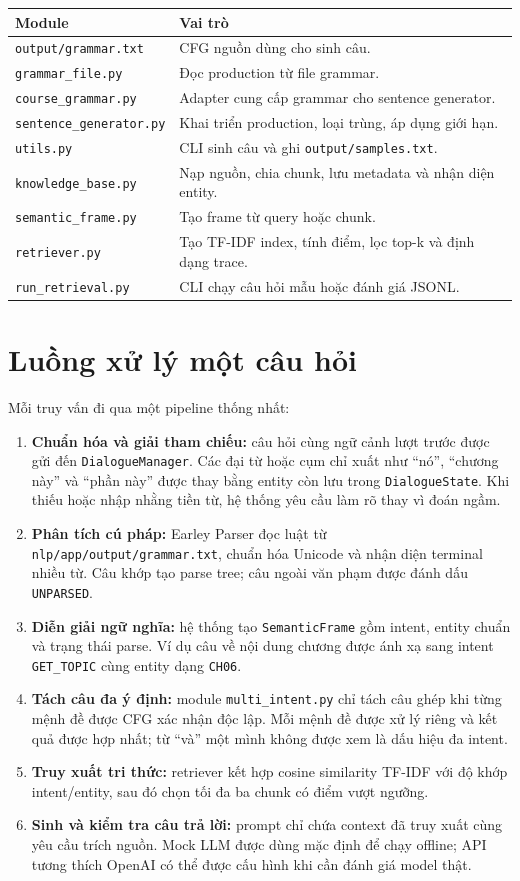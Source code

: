\begin{longtable}{p{}p{}}
\toprule
Module & Vai trò \\
\midrule
\texttt{output/grammar.txt} & CFG nguồn dùng cho sinh câu. \\
\texttt{grammar\_file.py} & Đọc production từ file grammar. \\
\texttt{course\_grammar.py} & Adapter cung cấp grammar cho sentence generator. \\
\texttt{sentence\_generator.py} & Khai triển production, loại trùng, áp dụng giới hạn. \\
\texttt{utils.py} & CLI sinh câu và ghi \texttt{output/samples.txt}. \\
\texttt{knowledge\_base.py} & Nạp nguồn, chia chunk, lưu metadata và nhận diện entity. \\
\texttt{semantic\_frame.py} & Tạo frame từ query hoặc chunk. \\
\texttt{retriever.py} & Tạo TF-IDF index, tính điểm, lọc top-k và định dạng trace. \\
\texttt{run\_retrieval.py} & CLI chạy câu hỏi mẫu hoặc đánh giá JSONL. \\
\bottomrule
\end{longtable}

\section{Luồng xử lý một câu hỏi}

Mỗi truy vấn đi qua một pipeline thống nhất:
\begin{enumerate}
  \item \textbf{Chuẩn hóa và giải tham chiếu:} câu hỏi cùng ngữ cảnh lượt trước được gửi đến \texttt{DialogueManager}. Các đại từ hoặc cụm chỉ xuất như “nó”, “chương này” và “phần này” được thay bằng entity còn lưu trong \texttt{DialogueState}. Khi thiếu hoặc nhập nhằng tiền từ, hệ thống yêu cầu làm rõ thay vì đoán ngầm.
  \item \textbf{Phân tích cú pháp:} Earley Parser đọc luật từ \texttt{nlp/app/output/grammar.txt}, chuẩn hóa Unicode và nhận diện terminal nhiều từ. Câu khớp tạo parse tree; câu ngoài văn phạm được đánh dấu \texttt{UNPARSED}.
  \item \textbf{Diễn giải ngữ nghĩa:} hệ thống tạo \texttt{SemanticFrame} gồm intent, entity chuẩn và trạng thái parse. Ví dụ câu về nội dung chương được ánh xạ sang intent \texttt{GET\_TOPIC} cùng entity dạng \texttt{CH06}.
  \item \textbf{Tách câu đa ý định:} module \texttt{multi\_intent.py} chỉ tách câu ghép khi từng mệnh đề được CFG xác nhận độc lập. Mỗi mệnh đề được xử lý riêng và kết quả được hợp nhất; từ “và” một mình không được xem là dấu hiệu đa intent.
  \item \textbf{Truy xuất tri thức:} retriever kết hợp cosine similarity TF-IDF với độ khớp intent/entity, sau đó chọn tối đa ba chunk có điểm vượt ngưỡng.
  \item \textbf{Sinh và kiểm tra câu trả lời:} prompt chỉ chứa context đã truy xuất cùng yêu cầu trích nguồn. Mock LLM được dùng mặc định để chạy offline; API tương thích OpenAI có thể được cấu hình khi cần đánh giá model thật.
\end{enumerate}

